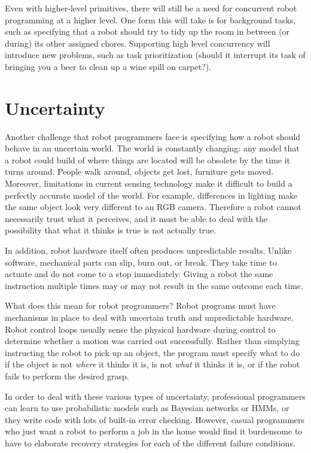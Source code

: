 \documentclass[11pt,twocolumn]{article}
\begin{document}
Even with higher-level primitives, there will still be a need for concurrent robot programming at a higher level. One form this will take is for background tasks, such as specifying that a robot should try to tidy up the room in between (or during) its other assigned chores. Supporting high level concurrency will introduce new problems, such as task prioritization (should it interrupt its task of bringing you a beer to clean up a wine spill on carpet?).

\section{Uncertainty}


Another challenge that robot programmers face is specifying how a robot should behave in an uncertain world. The world is constantly changing: any model that a robot could build of where things are located will be obsolete by the time it turns around. People walk around, objects get lost, furniture gets moved. Moreover, limitations in current sensing technology make it difficult to build a perfectly accurate model of the world. For example, differences in lighting make the same object look very different to an RGB camera. Therefore a robot cannot necessarily trust what it perceives, and it must be able to deal with the possibility that what it thinks is true is not actually true.

In addition, robot hardware itself often produces unpredictable results. Unlike software, mechanical parts can slip, burn out, or break. They take time to actuate and do not come to a stop immediately. Giving a robot the same instruction multiple times may or may not result in the same outcome each time.

What does this mean for robot programmers? Robot programs must have mechanisms in place to deal with uncertain truth and unpredictable hardware. Robot control loops usually sense the physical hardware during control to determine whether a motion was carried out successfully. 
Rather than simplying instructing the robot to pick up an object, the program must specify what to do if the object is not {\em where} it thinks it is, is not {\em what} it thinks it is, or if the robot fails to perform the desired grasp.

In order to deal with these various types of uncertainty, professional programmers can learn to use probabilistic models such as Bayesian networks or HMMs, or they write code with lots of built-in error checking. However, casual programmers who just want a robot to perform a job in the home would find it burdensome to have to elaborate recovery strategies for each of the different failure conditions.
\end{document}
